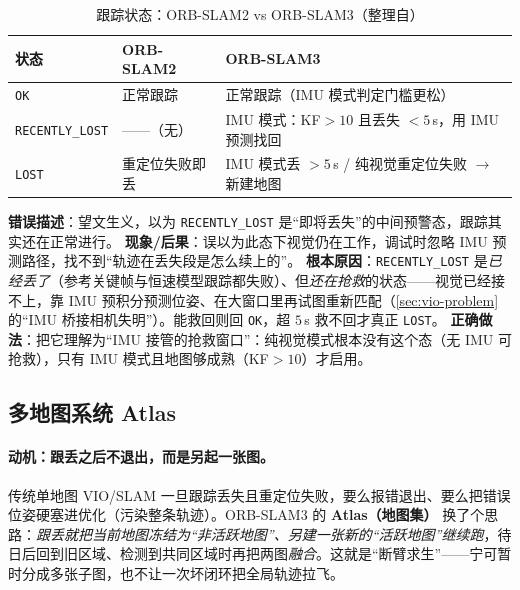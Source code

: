 \begin{table}[H]\centering\small
\caption{跟踪状态：ORB-SLAM2 vs ORB-SLAM3（整理自\cite{campos2021orbslam3,murartal2017orbslam2}）}
\label{tab:vio-track-states}
\begin{tabular}{lll}
\toprule
状态 & ORB-SLAM2 & ORB-SLAM3 \\
\midrule
\texttt{OK} & 正常跟踪 & 正常跟踪（IMU 模式判定门槛更松） \\
\texttt{RECENTLY\_LOST} & ——（无） & IMU 模式：KF$>10$ 且丢失 $<5\,$s，用 IMU 预测找回 \\
\texttt{LOST} & 重定位失败即丢 & IMU 模式丢 $>5\,$s / 纯视觉重定位失败 $\to$ 新建地图 \\
\bottomrule
\end{tabular}
\end{table}

\begin{pitfall}
\textbf{错误描述}：望文生义，以为 \texttt{RECENTLY\_LOST} 是“即将丢失”的中间预警态，跟踪其实还在正常进行。
\textbf{现象/后果}：误以为此态下视觉仍在工作，调试时忽略 IMU 预测路径，找不到“轨迹在丢失段是怎么续上的”。
\textbf{根本原因}：\texttt{RECENTLY\_LOST} 是\emph{已经丢了}（参考关键帧与恒速模型跟踪都失败）、但\emph{还在抢救}的状态——视觉已经接不上，靠 IMU 预积分预测位姿、在大窗口里再试图重新匹配（\cref{sec:vio-problem} 的“IMU 桥接相机失明”）。能救回则回 \texttt{OK}，超 $5\,$s 救不回才真正 \texttt{LOST}。
\textbf{正确做法}：把它理解为“IMU 接管的抢救窗口”：纯视觉模式根本没有这个态（无 IMU 可抢救），只有 IMU 模式且地图够成熟（KF$>10$）才启用。
\end{pitfall}

\subsection{多地图系统 Atlas}
\label{sec:vio-atlas}

\paragraph{动机：跟丢之后不退出，而是另起一张图。}
传统单地图 VIO/SLAM 一旦跟踪丢失且重定位失败，要么报错退出、要么把错误位姿硬塞进优化（污染整条轨迹）。ORB-SLAM3 的 \textbf{Atlas（地图集）}\cite{elvira2019atlas,campos2021orbslam3} 换了个思路：\emph{跟丢就把当前地图冻结为“非活跃地图”、另建一张新的“活跃地图”继续跑}，待日后回到旧区域、检测到共同区域时再把两图\emph{融合}。这就是“断臂求生”——宁可暂时分成多张子图，也不让一次坏闭环把全局轨迹拉飞。


